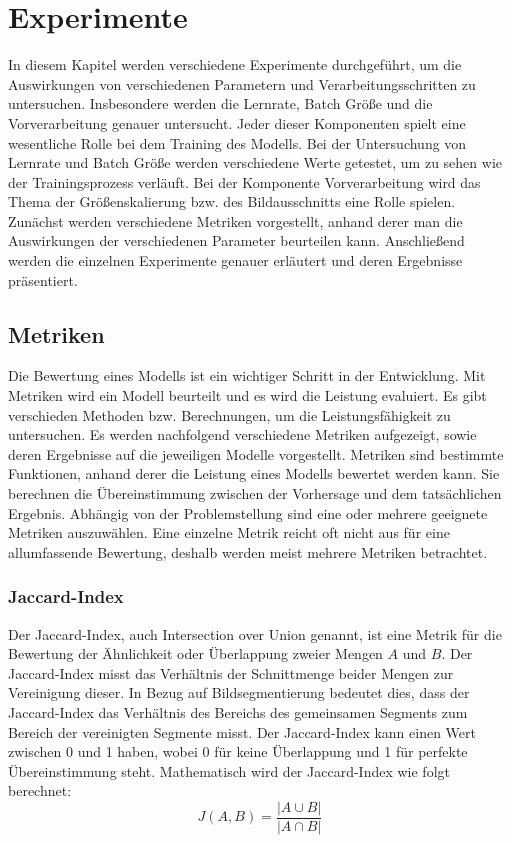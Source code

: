 \chapter{Experimente}
In diesem Kapitel werden verschiedene Experimente durchgeführt, um die Auswirkungen von verschiedenen Parametern und Verarbeitungsschritten zu untersuchen. Insbesondere werden die Lernrate, Batch Größe und die Vorverarbeitung genauer untersucht. Jeder dieser Komponenten spielt eine wesentliche Rolle bei dem Training des \gls{Modell}s. Bei der Untersuchung von Lernrate und Batch Größe werden verschiedene Werte getestet, um zu sehen wie der Trainingsprozess verläuft. Bei der Komponente Vorverarbeitung wird das Thema der Größenskalierung bzw. des Bildausschnitts eine Rolle spielen.\\
Zunächst werden verschiedene Metriken vorgestellt, anhand derer man die Auswirkungen der verschiedenen Parameter beurteilen kann. Anschließend werden die einzelnen Experimente genauer erläutert und deren Ergebnisse präsentiert.

\section{Metriken}
Die Bewertung eines \gls{Modell}s ist ein wichtiger Schritt in der Entwicklung. Mit Metriken wird ein \gls{Modell} beurteilt und es wird die Leistung evaluiert. Es gibt verschieden Methoden bzw. Berechnungen, um die Leistungsfähigkeit zu untersuchen. Es werden nachfolgend verschiedene Metriken aufgezeigt, sowie deren Ergebnisse auf die jeweiligen \gls{Modell}e vorgestellt.
Metriken sind bestimmte Funktionen, anhand derer die Leistung eines \glspl{Modell} bewertet werden kann. Sie berechnen die Übereinstimmung zwischen der Vorhersage und dem tatsächlichen Ergebnis. Abhängig von der Problemstellung sind eine oder mehrere geeignete Metriken auszuwählen. Eine einzelne Metrik reicht oft nicht aus für eine allumfassende Bewertung, deshalb werden meist mehrere Metriken betrachtet.
\subsection{Jaccard-Index}
Der Jaccard-Index, auch Intersection over Union genannt, ist eine Metrik für die Bewertung der Ähnlichkeit oder Überlappung zweier Mengen $A$ und $B$. Der Jaccard-Index misst das Verhältnis der Schnittmenge beider Mengen zur Vereinigung dieser. In Bezug auf Bildsegmentierung bedeutet dies, dass der Jaccard-Index das Verhältnis des Bereichs des gemeinsamen Segments zum Bereich der vereinigten Segmente misst. Der Jaccard-Index kann einen Wert zwischen 0 und 1 haben, wobei 0 für keine Überlappung und 1 für perfekte Übereinstimmung steht. Mathematisch wird der Jaccard-Index wie folgt berechnet: \cite[vgl.][]{GarciaGarcia2017}
\begin{equation}
	J(A,B) =  \dfrac{\vert A \cup B\vert }{\vert A \cap B\vert}
\end{equation} 

